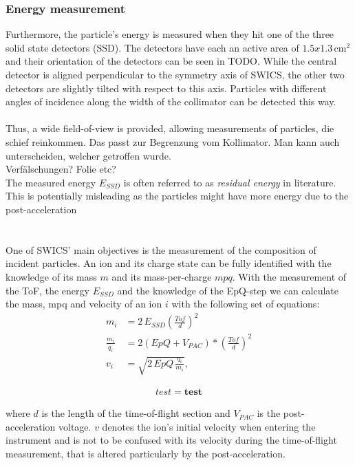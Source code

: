 \subsubsection{Energy measurement}
Furthermore, the particle's energy is measured when they hit one of the three solid state detectors (SSD). The detectors have each an active area of $1.5 x 1.3 \,\mathrm{cm^2}$ and their orientation of the detectors can be seen in TODO. While the central detector is aligned perpendicular to the symmetry axis of SWICS, the other two detectors are slightly tilted with respect to this axis. Particles with different angles of incidence along the width of the collimator can be detected this way.
\\ \\
Thus, a wide field-of-view is provided, allowing measurements of particles, die schief reinkommen. Das passt zur Begrenzung vom Kollimator. Man kann auch unterscheiden, welcher getroffen wurde.\\
Verfälschungen? Folie etc? \\ 
The measured energy $E_{SSD}$ is often referred to as \textit{residual energy} in literature. This is potentially misleading as the particles might have more energy due to the post-acceleration 
\\ \\ \\
One of SWICS' main objectives is the measurement of the composition of incident particles. An ion and its charge state can be fully identified with the knowledge of its mass $m$ and its mass-per-charge $mpq$. 
With the measurement of the ToF, the energy $E_{SSD}$ and the knowledge of the EpQ-step we can calculate the mass, mpq and velocity of an ion $i$ with the following set of equations:
\begin{align}
m_i &= 2\,E_{SSD} \left( \frac{Tof}{d}\right)^2 \label{eq:swics_set1}\\
\frac{m_i}{q_i} &= 2 \left(EpQ + V_{PAC}\right) * \left(\frac{Tof}{d}\right)^2 \label{eq:swics_set2} \\
v_i &= \sqrt{2\,EpQ\,\frac{q_i}{m_i}},
\label{eq:swics_set3}
\end{align}


\begin{align}
test = \textbf{test}
\end{align}

where $d$ is the length of the time-of-flight section and $V_{PAC}$ is the post-acceleration voltage. $v$ denotes the ion's initial velocity when entering the instrument and is not to be confused with its velocity during the time-of-flight measurement, that is altered particularly by the post-acceleration.